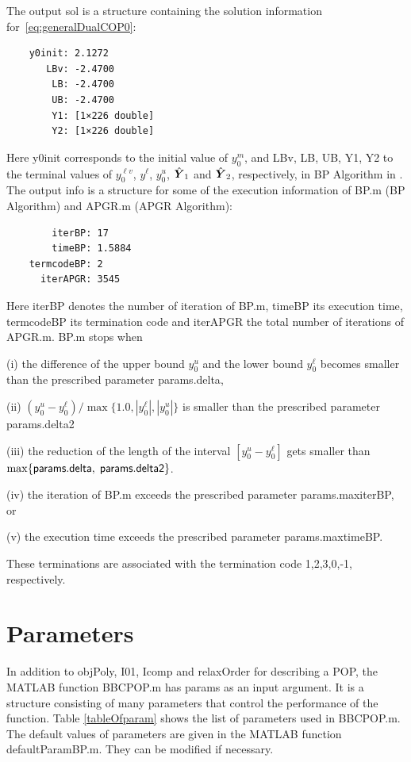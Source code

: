 \documentclass[12pt]{article}
\def\Y{\mbox{\boldmath $Y$}}
\def\matBP{BBCPOP}
\begin{document}
The output {\sf sol} is a structure containing the solution information for~\eqref{eq:generalDualCOP0}:
\begin{verbatim}
    y0init: 2.1272
       LBv: -2.4700
        LB: -2.4700
        UB: -2.4700
        Y1: [1×226 double]
        Y2: [1×226 double]
\end{verbatim}
Here {\sf y0init} corresponds to the initial value of $y_0^m$,  and   
{\sf LBv, LB, UB, Y1, Y2} to the terminal values of $y^{\ell v}_0$, $y^{\ell}$, $y^u_0$, 
$\hat{\Y}_1$ and $\hat{\Y}_2$, respectively,  in BP Algorithm in \cite{ITO2018}.
The output {\sf info} is a structure  
for some of the execution information of BP.m (BP Algorithm) and APGR.m 
(APGR Algorithm):
\begin{verbatim}
        iterBP: 17
        timeBP: 1.5884
    termcodeBP: 2
      iterAPGR: 3545
\end{verbatim}
Here {\sf iterBP} denotes the number of iteration of BP.m, {\sf timeBP} its execution time, 
{\sf termcodeBP} its termination code and {\sf iterAPGR} the total number of iterations of APGR.m. 
BP.m stops when 
\begin{description}
\item{(i) } the difference of the upper bound $y_0^u$ and the lower bound $y_0^\ell$ becomes 
 smaller than the prescribed parameter 
{\sf params.delta},
\item{(ii) } $(y_0^u-y_0^\ell)/\max\{1.0,|y_0^\ell|, |y_0^u|\}$ is smaller than the prescribed parameter
{\sf params.delta2}
\item{(iii) } the reduction of the length of the interval $[y_0^u-y_0^\ell]$ gets smaller than 
$\max\{{\sf params.delta},$ $ {\sf params.delta2}\}$.
\item{(iv) } the iteration of BP.m exceeds the prescribed parameter {\sf params.maxiterBP}, or 
\item{(v) } the execution time exceeds the prescribed parameter {\sf params.maxtimeBP}. 
\end{description}
These terminations are associated with the termination code 1,2,3,0,-1, respectively. 



\section{Parameters}
\label{PARAM}

In addition to {\sf objPoly}, {\sf I01}, {\sf Icomp} and {\sf relaxOrder} for  describing a POP,  
the MATLAB function \matBP.m has {\sf params} as an input argument. It is a structure consisting of 
many parameters that control the performance of the function. Table \ref{tableOfparam} 
shows the list of parameters used in \matBP.m. The default values of parameters are given in the 
MATLAB function defaultParamBP.m. They can be modified if necessary. 
\end{document}
